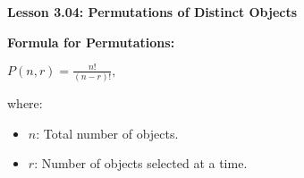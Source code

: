 \begin{center}
\textbf{Lesson 3.04: Permutations of Distinct Objects}
\end{center}

\vspace*{-1.5ex}

\noindent  \textbf{Formula for Permutations:}

{\centering $ 
          P(n, r) = \frac{n!}{(n-r)!},
 $\par}         
          where:
          \begin{itemize}
              \item \(n\): Total number of objects.
              \item \(r\): Number of objects selected at a time.
          \end{itemize}

